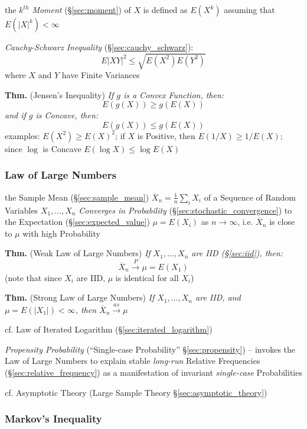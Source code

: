 the \emph{$k^{th}$ Moment} (\S\ref{sec:moment}) of $X$ is defined as $E(X^k)$
assuming that $E(|X|^k) < \infty$

\emph{Cauchy-Schwarz Inequality} (\S\ref{sec:cauchy_schwarz}):
\[
  E|XY|^2 \leq \sqrt{E(X^2)E(Y^2)}
\]
where $X$ and $Y$ have Finite Variances

\textbf{Thm.} (Jensen's Inequality) \emph{
  If $g$ is a Convex Function, then:
  \[
    E(g(X)) \geq g(E(X))
  \]
  and if $g$ is Concave, then:
  \[
    E(g(X)) \leq g(E(X))
  \]
}
examples: $E(X^2) \geq E(X)^2$; if $X$ is Positive, then $E(1/X) \geq 1/E(X)$;
since $\log$ is Concave $E(\log X) \leq \log E(X)$



\subsubsection{Law of Large Numbers}\label{sec:large_numbers}

the Sample Mean (\S\ref{sec:sample_mean})
$\overline{X}_n = \frac{1}{n}\sum_i X_i$ of a Sequence of Random Variables
$X_1, \ldots, X_n$ \emph{Converges in Probability}
(\S\ref{sec:stochastic_convergence}) to the Expectation
(\S\ref{sec:expected_value}) $\mu = E(X_i)$ as $n \rightarrow \infty$, i.e.
$\overline{X}_n$ is close to $\mu$ with high Probability

\textbf{Thm.} (Weak Law of Large Numbers) \emph{If $X_1, \ldots, X_n$ are IID
  (\S\ref{sec:iid}), then:
  \[
    \overline{X}_n \xrightarrow{P} \mu = E(X_1)
  \]
}
(note that since $X_i$ are IID, $\mu$ is identical for all $X_i$)

\textbf{Thm.} (Strong Law of Large Numbers) \emph{If $X_1, \ldots, X_n$ are IID,
  and $\mu = E(|X_1|) < \infty$, then $\overline{X}_n \xrightarrow{as} \mu$}

\fist cf. Law of Iterated Logarithm (\S\ref{sec:iterated_logarithm})

\fist \emph{Propensity Probability} (``Single-case Probability''
\S\ref{sec:propensity}) -- invokes the Law of Large Numbers to explain stable
\emph{long-run} Relative Frequencies (\S\ref{sec:relative_frequency}) as a
manifestation of invariant \emph{single-case} Probabilities

\fist cf. Asymptotic Theory (Large Sample Theory \S\ref{sec:asymptotic_theory})



\subsubsection{Markov's Inequality}\label{sec:markovs_inequality}

